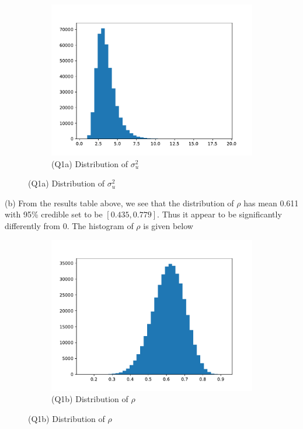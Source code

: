 \documentclass{homeworg}
\begin{document}
\begin{figure}[H]
\begin{subfigure}{0.48\textwidth}
	\includegraphics[width=\textwidth]{q1_a_sigmau.pdf}
	\caption{(Q1a) Distribution of $\sigma_u^2$}
\end{subfigure}
\end{figure}




(b) From the results table above, we see that the distribution of $\rho$ has mean 0.611 with 95\% credible set to be $[0.435,0.779]$. Thus it appear to be significantly differently from 0. The histogram of $\rho$ is given below
\begin{figure}[h]
\caption{Q1(b) Parameter Histogram}
\begin{subfigure}[b]{0.48\textwidth}
\centering
\includegraphics[width=\textwidth]{q1_b_rho.pdf}
\caption{(Q1b) Distribution of $\rho$}
\end{subfigure}
\end{figure}
\end{document}
